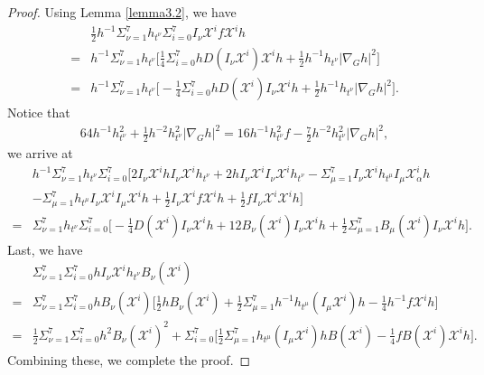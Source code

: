 \documentclass[reqno,12pt]{amsart}
\numberwithin{equation}{section}
\theoremstyle{plain}
\theoremstyle{definition}
\begin{document}
\begin{proof}
    Using Lemma \ref{lemma3.2}, we have
\begin{align*}
   & \frac{1}{2}h^{-1}\Sigma_{\nu=1}^7h_{t^\nu}\Sigma_{i=0}^7I_\nu\mathscr{X}^i f\mathscr{X}^i h\\=&h^{-1}\Sigma_{\nu=1}^7h_{t^\nu}\bigg[\frac{1}{4}\Sigma_{i=0}^7hD(I_\nu\mathscr{X}^i)\mathscr{X}^i h +\frac{1}{2}h^{-1}h_{t^\nu}|\nabla_G h|^2\bigg]\\=&h^{-1}\Sigma_{\nu=1}^7h_{t^\nu}\bigg[-\frac{1}{4}\Sigma_{i=0}^7hD(\mathscr{X}^i)I_\nu\mathscr{X}^i h +\frac{1}{2}h^{-1}h_{t^\nu}|\nabla_G h|^2\bigg].\end{align*}
   Notice that
\begin{align*}
    64h^{-1}h^2_{t^\nu}+\frac{1}{2}h^{-2}h^2_{t^\nu}|\nabla_G h|^2=16h^{-1}h^2_{t^\nu}f-\frac{7}{2}h^{-2}h^2_{t^\nu}|\nabla_G h|^2,
    \end{align*}
we arrive at
\begin{align*}
   &h^{-1}\Sigma_{\nu=1}^7h_{t^\nu}\Sigma_{i=0}^7\bigg[2I_\nu\mathscr{X}^i h I_\nu\mathscr{X}^i h_{t^\nu}+2h I_\nu\mathscr{X}^i I_\nu\mathscr{X}^i h_{t^\nu}-\Sigma_{\mu=1}^7I_\nu\mathscr{X}^i h_{t^\mu}I_\mu\mathscr{X}^i_\alpha h\\&-\Sigma_{\mu=1}^7h_{t^\mu}I_\nu\mathscr{X}^i I_\mu\mathscr{X}^i h+\frac{1}{2}I_\nu\mathscr{X}^i f\mathscr{X}^i h+\frac{1}{2}fI_\nu\mathscr{X}^i\mathscr{X}^i h\bigg]\\=&\Sigma_{\nu=1}^7h_{t^\nu}\Sigma_{i=0}^7\bigg[-\frac{1}{4}D(\mathscr{X}^i )I_\nu\mathscr{X}^i h+12B_\nu(\mathscr{X}^i)I_\nu\mathscr{X}^ih+\frac{1}{2}\Sigma_{\mu=1}^7B_\mu(\mathscr{X}^i)I_\nu\mathscr{X}^i h\bigg].
    \end{align*}
Last, we have
\begin{align*}
    &\Sigma_{\nu=1}^7\Sigma_{i=0}^7hI_\nu\mathscr{X}^i h_{t^\nu}B_\nu(\mathscr{X}^i)\\=&\Sigma_{\nu=1}^7\Sigma_{i=0}^7hB_\nu(\mathscr{X}^i)\bigg[\frac{1}{2}hB_\nu(\mathscr{X}^i)+\frac{1}{2}\Sigma_{\mu=1}^7h^{-1}h_{t^\mu}(I_\mu\mathscr{X}^i)h-\frac{1}{4}h^{-1}f\mathscr{X}^i h\bigg]\\=&\frac{1}{2}\Sigma_{\nu=1}^7\Sigma_{i=0}^7h^2B_\nu(\mathscr{X}^i)^2+\Sigma_{i=0}^7\bigg[\frac{1}{2}\Sigma_{\mu=1}^7h_{t^\mu}(I_\mu\mathscr{X}^i)h B(\mathscr{X}^i)-\frac{1}{4}fB(\mathscr{X}^i )\mathscr{X}^i h\bigg].
\end{align*}
Combining these, we complete the proof.
\end{proof}
\end{document}

